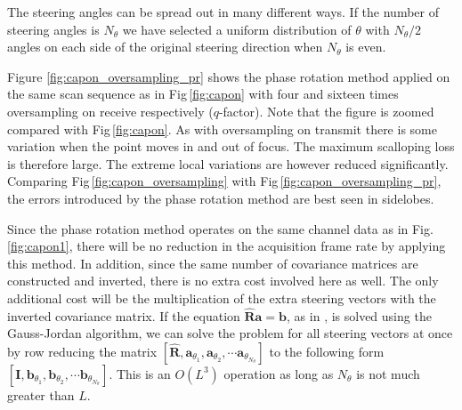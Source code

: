 \documentclass[draftcls]{IEEEtran}
\newcommand{\mat}[1]{\mathbf{#1}}
\renewcommand{\vec}[1]{\mathbf{#1}}
\newcommand{\img}{img/}
\begin{document}
The steering angles can be spread out in many different ways. If the number of steering angles is $N_\theta$ we have selected a uniform distribution of $\theta$  with $N_\theta/2$ angles on each side of the original steering direction when $N_\theta$ is even.%

Figure \ref{fig:capon_oversampling_pr} shows the phase rotation method applied on the same scan sequence as in Fig\,\ref{fig:capon} with four and sixteen times oversampling on receive respectively ($q$-factor). Note that the figure is zoomed compared with Fig\,\ref{fig:capon}. As with oversampling on transmit there is some variation when the point moves in and out of focus. The maximum scalloping loss is therefore large. The extreme local variations are however reduced significantly. Comparing Fig\,\ref{fig:capon_oversampling} with Fig\,\ref{fig:capon_oversampling_pr}, the errors introduced by the phase rotation method are best seen in sidelobes.  

Since the phase rotation method operates on the same channel data as in Fig.\,\ref{fig:capon1}, there will be no reduction in the acquisition frame rate by applying this method. In addition, since the same number of covariance matrices are constructed and inverted, there is no extra cost involved here as well. The only additional cost will be the multiplication of the extra steering vectors with the inverted covariance matrix. If the equation $\mat{\hat{R}}\vec{a} = \vec{b}$, as in \cite{Asen}, is solved using the Gauss-Jordan algorithm, we can solve the problem for all steering vectors at once by row reducing the matrix $[\mat{\hat{R}},  \vec{a}_{\theta_1}, \vec{a}_{\theta_2}, \cdots \vec{a}_{\theta_{N_\theta}}]$ to the following form $[\mat{I},  \vec{b}_{\theta_1}, \vec{b}_{\theta_2}, \cdots \vec{b}_{\theta_{N_\theta}}]$. This is an $O(L^3)$ operation as long as $N_\theta$ is not much greater than $L$.

\begin{figure*}[!t]
	\centerline{
	}
	\caption{Capon beamforming as described in Fig\,\ref{fig:capon} with oversampling based on phase rotation. The figure is zoomed compared with Fig\,\ref{fig:capon} to better see the beam-to-beam variation. a) Four times oversampling. b) Sixteen times oversampling.}
	\label{fig:capon_oversampling_pr}
\end{figure*}
\end{document}
